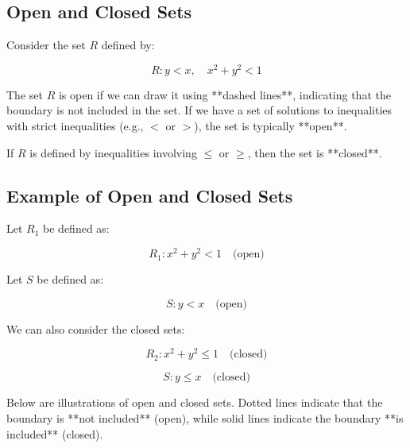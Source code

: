 \documentclass{report}
\begin{document}
\subsection{Open and Closed Sets}

Consider the set $R$ defined by:

\[
	R: y < x, \quad x^2 + y^2 < 1
\]

The set $R$ is open if we can draw it using **dashed lines**, indicating that the boundary is not included in the set. If we have a set of solutions to inequalities with strict inequalities (e.g., $<$ or $>$), the set is typically **open**.

If $R$ is defined by inequalities involving $\leq$ or $\geq$, then the set is **closed**.

\subsection*{Example of Open and Closed Sets}

Let $R_1$ be defined as:

\[
	R_1: x^2 + y^2 < 1 \quad \text{(open)}
\]

Let $S$ be defined as:

\[
	S: y < x \quad \text{(open)}
\]

We can also consider the closed sets:

\[
	R_2: x^2 + y^2 \leq 1 \quad \text{(closed)}
\]

\[
	S: y \leq x \quad \text{(closed)}
\]

Below are illustrations of open and closed sets. Dotted lines indicate that the boundary is **not included** (open), while solid lines indicate the boundary **is included** (closed).

\begin{center}
\end{center}
\end{document}
